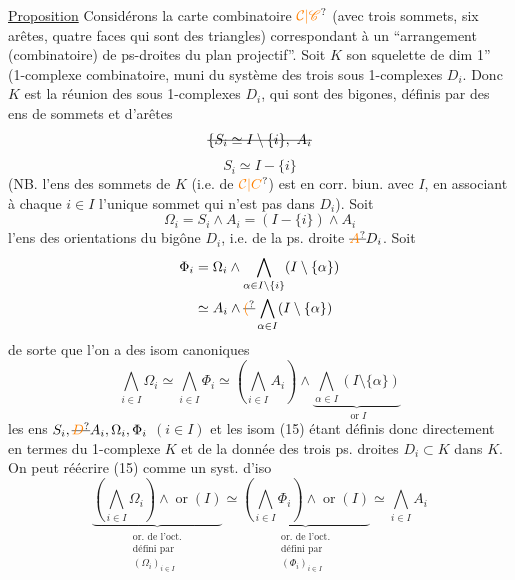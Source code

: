 \uline{Proposition} Considérons la carte combinatoire $\unsure{\mathcal C|\mathscr C}$ (avec trois sommets, six arêtes, quatre faces qui sont des triangles) correspondant à un ``arrangement (combinatoire) de   ps-droites  du plan projectif''. Soit $K$ son
squelette de dim 1'' (1-complexe combinatoire, muni du système des trois  sous 1-complexes $D_i$.  Donc $K$ est la réunion des sous\deleted{\unsure{-}} 1-complexes $D_i$, qui sont des bigones,  définis par des ens  de sommets  et d'arêtes    
\[
 \deleted{\{S_i\simeq I\setminus\{i\},\ A_i}
\]
\[
 S_i\simeq I-\{i\}
\]
(NB.  l'ens des sommets de $K$ (i.e. de $\unsure{\mathcal C|C}$) est en corr. biun. avec $I$, en associant à chaque $i\in I$ l'unique sommet qui n'est pas dans $D_i$). Soit
\[
 \Omega_i=S_i\wedge A_i=(I-\{i\})\wedge A_i
\]
l'ens des orientations du bigône $D_i$, i.e. de la ps. droite $\deleted{\unsure{A}}D_i$. Soit
\[
\begin{aligned}
 \Phi_i&=\Omega_i\wedge\bigwedge_{\alpha\in I\setminus\{i\}}(I\setminus\{\alpha\})\\
 &\simeq A_i\wedge\deleted{\unsure{(}}\bigwedge_{\alpha\in I}(I\setminus\{\alpha\})
\end{aligned}
\]
de sorte que l'on a des isom canoniques
\[
 \bigwedge_{i\in I}\Omega_i\simeq\bigwedge_{i\in I}\Phi_i
 \simeq\left(\bigwedge_{i\in I}A_i\right)\wedge
 \underbrace{\bigwedge_{\alpha\in I}(I\setminus\{\alpha\})}_{\operatorname{or} I}\tag*{(15)}
\]
les ens $S_i,\deleted{\unsure{D}}A_i,\Omega_i,\Phi_i$ $(i\in I)$ et les isom
(15) étant définis donc directement en termes du 1-complexe  $K$ et de la donnée des trois ps. droites $D_i\subset K$ dans $K$. On peut réécrire (15) comme un syst. d'iso
\[
 \underbrace{\left(\bigwedge_{i\in I}\Omega_i\right)\wedge\operatorname{or}(I)}
 _{\substack{\text{or. de l'oct.}\\\text{défini par}\\(\Omega_i)_{i\in I}}}
 \simeq
 \underbrace{\left(\bigwedge_{i\in I}\Phi_i\right)\wedge\operatorname{or}(I)}
 _{\substack{\text{or. de l'oct.}\\\text{défini par}\\(\Phi_i)_{i\in I}}}
 \simeq\bigwedge_{i\in I}A_i\tag*{(15 bis)}
\]
